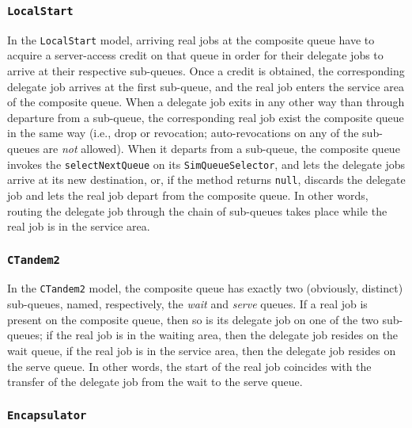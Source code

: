 \subsubsection{\lstinline|LocalStart|}
\label{sec:startmodel-localstart}

In the \lstinline|LocalStart| model,
  arriving real jobs at the composite queue
  have to acquire a server-access credit
  on that queue in order for their
  delegate jobs to arrive at their respective sub-queues.
Once a credit is obtained,
  the corresponding delegate job arrives
  at the first sub-queue,
  and the real job enters the service area
  of the composite queue.
When a delegate job exits in any other way than through departure from a sub-queue,
  the corresponding real job exist the composite queue in the same way (i.e., drop or revocation; auto-revocations on any of the sub-queues are {\em not\/} allowed).
When it departs from a sub-queue,
  the composite queue invokes the
  \lstinline|selectNextQueue| on its
  \lstinline|SimQueueSelector|,
  and lets the delegate jobs arrive at its
  new destination,
  or, if the method returns \lstinline|null|,
  discards the delegate job and lets the real job depart from the composite queue.
In other words,
  routing the delegate job through the
  chain of sub-queues takes place while the
  real job is in the service area.

\subsubsection{\lstinline|CTandem2|}
\label{sec:startmodel-ctandem2}

In the \lstinline|CTandem2| model,
  the composite queue has exactly two
  (obviously, distinct) sub-queues,
  named, respectively, the {\em wait\/}
  and {\em serve\/} queues.
If a real job is present on the composite queue,
  then so is its delegate job on one of the two sub-queues;
  if the real job is in the waiting area,
  then the delegate job resides on the wait queue,
  if the real job is in the service area,
  then the delegate job resides on the serve queue.
In  other words,
  the start of the real job coincides with the
  transfer of the delegate job from the wait to the
  serve queue.
  
\subsubsection{\lstinline|Encapsulator|}
\label{sec:startmodel-encapsulator}

